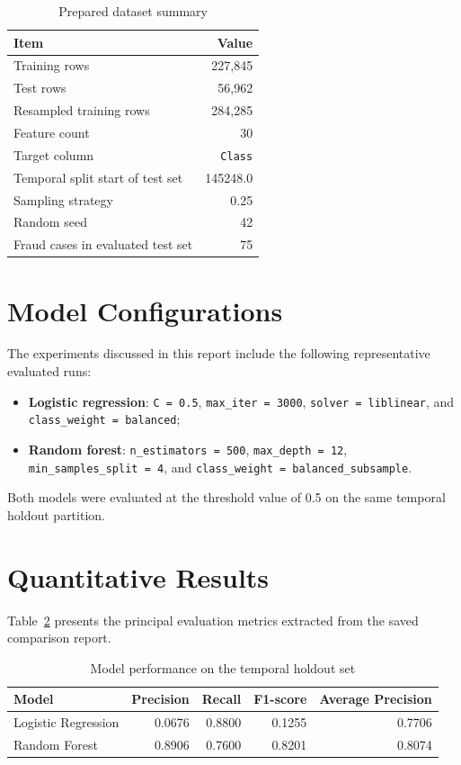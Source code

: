 \documentclass[12pt,a4paper]{report}
\begin{document}
\begin{table}[H]
\centering
\caption{Prepared dataset summary}
\label{tab:dataset-summary}
\begin{tabular}{lr}
\toprule
Item & Value \\
\midrule
Training rows & 227,845 \\
Test rows & 56,962 \\
Resampled training rows & 284,285 \\
Feature count & 30 \\
Target column & \texttt{Class} \\
Temporal split start of test set & 145248.0 \\
Sampling strategy & 0.25 \\
Random seed & 42 \\
Fraud cases in evaluated test set & 75 \\
\bottomrule
\end{tabular}
\end{table}

\section{Model Configurations}
The experiments discussed in this report include the following representative evaluated runs:
\begin{itemize}
    \item \textbf{Logistic regression}: \texttt{C = 0.5}, \texttt{max\_iter = 3000}, \texttt{solver = liblinear}, and \texttt{class\_weight = balanced};
    \item \textbf{Random forest}: \texttt{n\_estimators = 500}, \texttt{max\_depth = 12}, \texttt{min\_samples\_split = 4}, and \texttt{class\_weight = balanced\_subsample}.
\end{itemize}

Both models were evaluated at the threshold value of 0.5 on the same temporal holdout partition.

\section{Quantitative Results}
Table~\ref{tab:model-results} presents the principal evaluation metrics extracted from the saved comparison report.

\begin{table}[H]
\centering
\caption{Model performance on the temporal holdout set}
\label{tab:model-results}
\begin{tabular}{lrrrr}
\toprule
Model & Precision & Recall & F1-score & Average Precision \\
\midrule
Logistic Regression & 0.0676 & 0.8800 & 0.1255 & 0.7706 \\
Random Forest & 0.8906 & 0.7600 & 0.8201 & 0.8074 \\
\bottomrule
\end{tabular}
\end{table}
\end{document}
